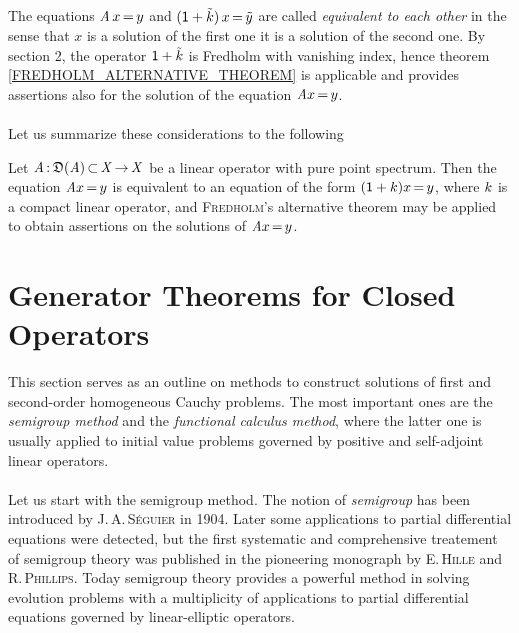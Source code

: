 \documentclass[11pt,twoside]{article}
\begin{document}
\subparagraph{}
The equations $\mathit{A} \,x {\,=\,} y$ and $({\mathsf{1}} + \tilde{k})\,x {\,=\,} \tilde{y}$
are called \textit{equivalent to each other} in the sense
that $x$ is a solution of the first one
\iff
it is a solution of the second one.
By section 2,
the operator ${\mathsf{1}} + \tilde{k}$ is Fredholm with vanishing index,
hence theorem \ref{FREDHOLM_ALTERNATIVE_THEOREM} is applicable
and provides assertions also for the solution of the equation $\mathit{A} x {\,=\,} y$.

\paragraph{}
Let us summarize these considerations to the following

\begin{theorem1}\label{FREDHOLM_ALTERNATIVE_THEOREM_II}
Let $\mathit{A} {\,:\,} \mathfrak{D}(\mathit{A}) {\,\subset\,} \mathit{X} {\,\to\,} \mathit{X}$ be a linear
operator with pure point spectrum.
Then the equation $\mathit{A} x {\,=\,} y$ is equivalent to an equation
of the form $({\mathsf{1}}+k)x {\,=\,} y$,
where $k$ is a compact linear operator,
and \textsc{Fredholm}'s alternative theorem may be applied
to obtain assertions on the solutions of $\mathit{A} x {\,=\,} y$.
\end{theorem1}

\section{Generator Theorems for Closed Operators}                              %
This section serves as an outline on methods to construct solutions
of first and second-order homogeneous Cauchy problems.
The most important ones are the \textit{semigroup method} and
the \textit{functional calculus method},
where the latter one is usually applied to initial value problems
governed by positive and self-adjoint linear operators.

\paragraph{} %
Let us start with the semigroup method.
The notion of \textit{semigroup} has been introduced
by \textsc{J.\,A.\,S\'{e}guier} in 1904.
Later some applications to partial differential equations were detected,
but the first systematic and comprehensive treatement of semigroup theory
was published in the pioneering monograph \cite{HP}
by \textsc{E.\,Hille} and \textsc{R.\,Phillips}.
Today semigroup theory provides a powerful method
in solving evolution problems
with a multiplicity of applications to partial differential equations
governed by linear-elliptic operators.
\end{document}
